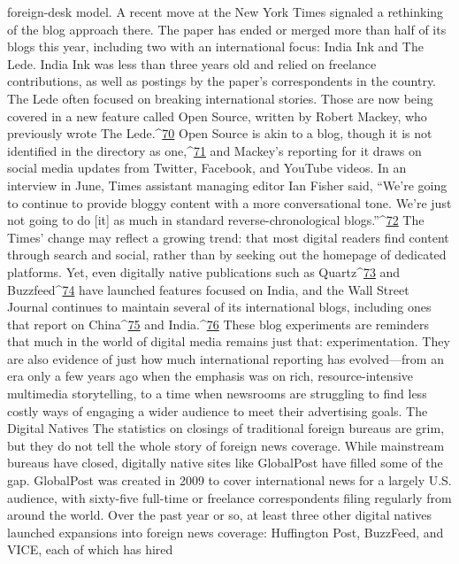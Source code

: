 foreign-desk model.
A recent move at the New York Times signaled a rethinking of the blog approach there.
The paper has ended or merged more than half of its blogs this year, including two with
an international focus: India Ink and The Lede. India Ink was less than three years old and
relied on freelance contributions, as well as postings by the paper’s correspondents in the
country. The Lede often focused on breaking international stories. Those are now being
covered in a new feature called Open Source, written by Robert Mackey, who previously
wrote The Lede.^{\href{#endnotes}{70}} Open Source is akin to a blog, though it is not identified in the
directory as one,^{\href{#endnotes}{71}} and Mackey’s reporting for it draws on social media updates from
Twitter, Facebook, and YouTube videos.
In an interview in June, Times assistant managing editor Ian Fisher said, ``We’re going to
continue to provide bloggy content with a more conversational tone. We’re just not going
to do [it] as much in standard reverse-chronological blogs.''^{\href{#endnotes}{72}}
The Times’ change may reflect a growing trend: that most digital readers find content
through search and social, rather than by seeking out the homepage of dedicated
platforms. Yet, even digitally native publications such as Quartz^{\href{#endnotes}{73}} and Buzzfeed^{\href{#endnotes}{74}} have
launched features focused on India, and the Wall Street Journal continues to maintain
several of its international blogs, including ones that report on China^{\href{#endnotes}{75}} and India.^{\href{#endnotes}{76}}
These blog experiments are reminders that much in the world of digital media remains
just that: experimentation. They are also evidence of just how much international
reporting has evolved—from an era only a few years ago when the emphasis was on rich,
resource-intensive multimedia storytelling, to a time when newsrooms are struggling to
find less costly ways of engaging a wider audience to meet their advertising goals.
The Digital Natives
The statistics on closings of traditional foreign bureaus are grim, but they do not tell the
whole story of foreign news coverage. While mainstream bureaus have closed, digitally
native sites like GlobalPost have filled some of the gap. GlobalPost was created in 2009
to cover international news for a largely U.S. audience, with sixty-five full-time or
freelance correspondents filing regularly from around the world.
Over the past year or so, at least three other digital natives launched expansions into
foreign news coverage: Huffington Post, BuzzFeed, and VICE, each of which has hired
